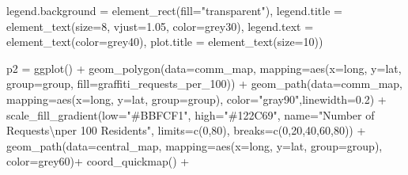 \documentclass[
]{report}
\newenvironment{Shaded}{}{}
\newcommand{\AttributeTok}[1]{\textcolor[rgb]{0.84,0.23,0.29}{#1}}
\newcommand{\DecValTok}[1]{\textcolor[rgb]{0.00,0.36,0.77}{#1}}
\newcommand{\FloatTok}[1]{\textcolor[rgb]{0.00,0.36,0.77}{#1}}
\newcommand{\FunctionTok}[1]{\textcolor[rgb]{0.44,0.26,0.76}{#1}}
\newcommand{\NormalTok}[1]{\textcolor[rgb]{0.14,0.16,0.18}{#1}}
\newcommand{\OtherTok}[1]{\textcolor[rgb]{0.44,0.26,0.76}{#1}}
\newcommand{\SpecialCharTok}[1]{\textcolor[rgb]{0.00,0.36,0.77}{#1}}
\newcommand{\StringTok}[1]{\textcolor[rgb]{0.01,0.18,0.38}{#1}}
\begin{document}
\begin{Shaded}
\begin{Highlighting}[]
        \AttributeTok{legend.background =} \FunctionTok{element\_rect}\NormalTok{(}\AttributeTok{fill=}\StringTok{"transparent"}\NormalTok{),}
        \AttributeTok{legend.title =} \FunctionTok{element\_text}\NormalTok{(}\AttributeTok{size=}\DecValTok{8}\NormalTok{, }\AttributeTok{vjust=}\FloatTok{1.05}\NormalTok{, }\AttributeTok{color=}\StringTok{\textquotesingle{}grey30\textquotesingle{}}\NormalTok{),}
        \AttributeTok{legend.text =} \FunctionTok{element\_text}\NormalTok{(}\AttributeTok{color=}\StringTok{\textquotesingle{}grey40\textquotesingle{}}\NormalTok{),}
        \AttributeTok{plot.title =} \FunctionTok{element\_text}\NormalTok{(}\AttributeTok{size=}\DecValTok{10}\NormalTok{))}


\NormalTok{p2 }\OtherTok{=} \FunctionTok{ggplot}\NormalTok{() }\SpecialCharTok{+}
  \FunctionTok{geom\_polygon}\NormalTok{(}\AttributeTok{data=}\NormalTok{comm\_map, }\AttributeTok{mapping=}\FunctionTok{aes}\NormalTok{(}\AttributeTok{x=}\NormalTok{long, }\AttributeTok{y=}\NormalTok{lat, }\AttributeTok{group=}\NormalTok{group, }\AttributeTok{fill=}\NormalTok{graffiti\_requests\_per\_100)) }\SpecialCharTok{+}
  \FunctionTok{geom\_path}\NormalTok{(}\AttributeTok{data=}\NormalTok{comm\_map, }\AttributeTok{mapping=}\FunctionTok{aes}\NormalTok{(}\AttributeTok{x=}\NormalTok{long, }\AttributeTok{y=}\NormalTok{lat, }\AttributeTok{group=}\NormalTok{group), }\AttributeTok{color=}\StringTok{"gray90"}\NormalTok{,}\AttributeTok{linewidth=}\FloatTok{0.2}\NormalTok{) }\SpecialCharTok{+}
  \FunctionTok{scale\_fill\_gradient}\NormalTok{(}\AttributeTok{low=}\StringTok{"\#BBFCF1"}\NormalTok{, }\AttributeTok{high=}\StringTok{"\#122C69"}\NormalTok{,}
                      \AttributeTok{name=}\StringTok{"Number of Requests}\SpecialCharTok{\textbackslash{}n}\StringTok{per 100 Residents"}\NormalTok{,}
                      \AttributeTok{limits=}\FunctionTok{c}\NormalTok{(}\DecValTok{0}\NormalTok{,}\DecValTok{80}\NormalTok{),}
                      \AttributeTok{breaks=}\FunctionTok{c}\NormalTok{(}\DecValTok{0}\NormalTok{,}\DecValTok{20}\NormalTok{,}\DecValTok{40}\NormalTok{,}\DecValTok{60}\NormalTok{,}\DecValTok{80}\NormalTok{)) }\SpecialCharTok{+}
  \FunctionTok{geom\_path}\NormalTok{(}\AttributeTok{data=}\NormalTok{central\_map, }\AttributeTok{mapping=}\FunctionTok{aes}\NormalTok{(}\AttributeTok{x=}\NormalTok{long, }\AttributeTok{y=}\NormalTok{lat, }\AttributeTok{group=}\NormalTok{group), }\AttributeTok{color=}\StringTok{\textquotesingle{}grey60\textquotesingle{}}\NormalTok{)}\SpecialCharTok{+}
  \FunctionTok{coord\_quickmap}\NormalTok{() }\SpecialCharTok{+}

\end{Highlighting}
\end{Shaded}
\end{document}
